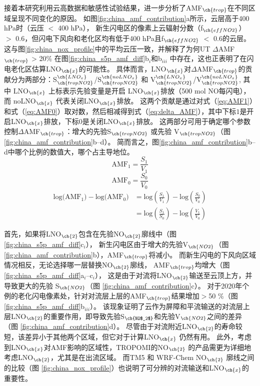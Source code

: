 接着本研究利用云高数据和敏感性试验结果，进一步分析了AMF$_{\ch{trop}}$在不同区域呈现不同变化的原因。
如图\ref{fig:china_amf_contribution}a所示，云层高于400 hPa时（云压 $<$ 400 hPa），
新生闪电区的像素上云辐射分数（f$_{\ch{effNO2}}$） $>$ 0.6，但闪电下风向和老化区均有低于400 hPa且f$_{\ch{effNO2}}$ $<$ 0.6的云层。
这与图\ref{fig:china_nox_profile}中的平均云压一致，并解释了为何UT $\Delta$AMF$_{\ch{trop}}$ > 20\% 在图\ref{fig:china_s5p_amf_diff}b$_i$和b$_{iii}$ 中存在，这也正表明了在闪电老化区估算LNO$_{\ch{x}}$的可能性。
具体而言，LNO$_{\ch{x}}$对$\Delta$AMF$_{\ch{trop}}$的贡献分为两部分：S$^{\ch{LNO_x}}_{\ch{tropNO2}}$/S$^{\ch{noLNO_x}}_{\ch{tropNO2}}$ 和 V$^{\ch{LNO_x}}_{\ch{tropNO2}}$/V$^{\ch{noLNO_x}}_{\ch{tropNO2}}$,
其中 LNO$_{\ch{x}}$ 上标表示先验变量是开启 LNO$_{\ch{x}}$排放（500 mol NO每闪电），而 noLNO$_{\ch{x}}$ 代表关闭LNO$_{\ch{x}}$排放。
这两个贡献是通过对式（\ref{eq:AMF1}）和式（\ref{eq:AMF0}）取对数，然后相减得到式（\ref{eq:delta_AMF}），其中下标$1$是开启LNO$_{\ch{x}}$排放，下标$0$是关闭LNO$_{\ch{x}}$排放。
这两部分可用于确定哪个参数控制$\Delta$AMF$_{\ch{trop}}$：增大的先验S$_{\ch{tropNO2}}$ 或先验 V$_{\ch{tropNO2}}$（图\ref{fig:china_amf_contribution}b--d）。
简而言之，图\ref{fig:china_amf_contribution}b--d中哪个比例的数值大，哪个占主导地位。
{
\abovedisplayskip=5pt%
\belowdisplayskip=5pt%
\begin{equation} \label{eq:AMF1}
\textrm{AMF}_1 = \frac{S_1}{V_1}
\end{equation}
\begin{equation} \label{eq:AMF0}
\textrm{AMF}_0 = \frac{S_0}{V_0}
\end{equation}
\begin{equation} \label{eq:delta_AMF}
\begin{split}
\textrm{log(AMF$_1$)} - \textrm{log(AMF$_0$)} & = \textrm{log}(\frac{S_1}{V_1}) - \textrm{log}(\frac{S_0}{V_0}) \\
                                              & = \textrm{log}(\frac{S_1}{S_0}) - \textrm{log}(\frac{V_1}{V_0})
\end{split}
\end{equation}
}

首先，如果将LNO$_{\ch{2}}$包含在先验NO$_{\ch{2}}$廓线中（图\ref{fig:china_s5p_amf_diff}c$_i$），
新生闪电区由于增大的先验V$_{\ch{NO2}}$（图 \ref{fig:china_amf_contribution}b），AMF$_{\ch{trop}}$将减小。
而新生闪电的下风向区域情况相反，无论选择哪一层替换NO$_{\ch{2}}$廓线，
AMF$_{\ch{trop}}$均增大（图\ref{fig:china_s5p_amf_diff}a$_{i}$--c$_{i}$），
这是由于对流将LNO$_{\ch{2}}$输送至云顶上方，并导致更大的先验 S$_{\ch{NO2}}$（图 \ref{fig:china_amf_contribution}c）。
对于2020年个例的老化闪电像素处，针对对流层上层的AMF$_{\ch{trop}}$结果增加$>$50 \%（图\ref{fig:china_s5p_amf_diff}b$_{iii}$）。
该现象证明了云作为屏障和平流输送的对流层上层LNO$_{\ch{2}}$的重要作用，即导致先验S$_{\ch{NO$_2$}}$和先验V$_{\ch{NO2}}$之间的差异（图 \ref{fig:china_amf_contribution}d）。
尽管由于对流附近LNO$_{\ch{2}}$的寿命较短，该差异小于其他两个区域，但它对于计算LNO$_{\ch{x}}$ 仍然有用。
此外，考虑到LNO$_{\ch{x}}$对AMF影响的区域性，TROPOMI的NO$_{\ch{2}}$ 的产品需更为详细地考虑LNO$_{\ch{2}}$，尤其是在出流区域。
而TM5 和 WRF-Chem NO$_{\ch{2}}$ 廓线之间的比较（图 \ref{fig:china_nox_profile}）也说明了可分辨的对流输送和LNO$_{\ch{x}}$的重要性。


